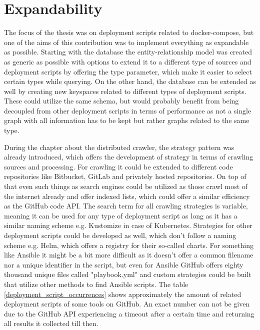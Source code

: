 \section{Expandability}
The focus of the thesis was on deployment scripts related to docker-compose, but one of the aims of this contribution was to implement everything as expandable as possible.
Starting with the database the entity-relationship model was created as generic as possible with options to extend it to a different type of sources and deployment scripts by offering the type parameter, which make it easier to select certain types while querying. On the other hand, the database can be extended as well by creating new keyspaces related to different types of deployment scripts. These could utilize the same schema, but would probably benefit from being decoupled from other deployment scripts in terms of performance as not a single graph with all information has to be kept but rather graphs related to the same type.

During the chapter about the distributed crawler, the strategy pattern was already introduced, which offers the development of strategy in terms of crawling sources and processing.
For crawling it could be extended to different code repositories like Bitbucket, GitLab and privately hosted repositories. On top of that even such things as search engines could be utilized as those crawl most of the internet already and offer indexed lists, which could offer a similar efficiency as the GitHub code API. The search term for all crawling strategies is variable, meaning it can be used for any type of deployment script as long as it has a similar naming scheme e.g. Kustomize in case of Kubernetes. Strategies for other deployment scripts could be developed as well, which don't follow a naming scheme e.g. Helm, which offers a registry for their so-called charts. For something like Ansible it might be a bit more difficult as it doesn't offer a common filename nor a unique identifier in the script, but even for Ansible GitHub offers eighty thousand unique files called "playbook.yml" and custom strategies could be built that utilize other methods to find Ansible scripts. The table \ref{deployment_script_occurrences} shows approximately the amount of related deployment scripts of some tools on GitHub. An exact number can not be given due to the GitHub API experiencing a timeout after a certain time and returning all results it collected till then.

